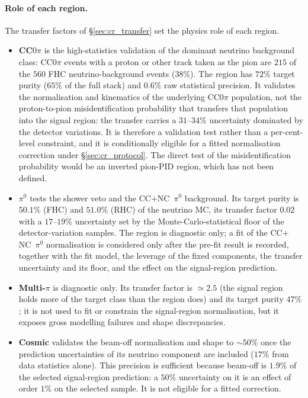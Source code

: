 \documentclass[11pt,a4paper]{article}
\begin{document}
\paragraph{Role of each region.} The transfer factors of \S\ref{sec:cr_transfer} set
the physics role of each region.
\begin{itemize}\itemsep2pt
  \item \textbf{CC$0\pi$} is the high-statistics validation of the dominant neutrino
    background class: CC$0\pi$ events with a proton or other track taken as the pion are
    $215$ of the $560$ FHC neutrino-background events ($38\%$). The region has $72\%$
    target purity ($65\%$ of the full stack) and $0.6\%$ raw statistical precision. It
    validates the normalisation and kinematics of the underlying CC$0\pi$ population,
    not the proton-to-pion misidentification probability that transfers that
    population into the signal region: the transfer carries a $31$--$34\%$ uncertainty
    dominated by the detector variations. It is therefore a validation test rather than
    a per-cent-level constraint, and it is conditionally eligible for a fitted
    normalisation correction under \S\ref{sec:cr_protocol}. The direct test of the
    misidentification probability would be an inverted pion-PID region, which has not been
    defined.
  \item \textbf{$\pi^0$} tests the shower veto and the CC$+$NC~$\pi^0$ background. Its
    target purity is $50.1\%$ (FHC) and $51.0\%$ (RHC) of the neutrino MC, its transfer
    factor $0.02$ with a $17$--$19\%$ uncertainty set by the Monte-Carlo-statistical
    floor of the detector-variation samples. The region is diagnostic only; a fit of the
    CC$+$NC~$\pi^0$ normalisation is considered only after the pre-fit result is recorded,
    together with the fit model, the leverage of the fixed components, the transfer
    uncertainty and its floor, and the effect on the signal-region prediction.
  \item \textbf{Multi-$\pi$} is diagnostic only. Its transfer factor is $\simeq2.5$
    (the signal region holds more of the target class than the region does) and its
    target purity $47\%$; it is not used to fit or constrain the signal-region
    normalisation, but it exposes gross modelling failures and shape discrepancies.
  \item \textbf{Cosmic} validates the beam-off normalisation and shape to $\sim\!50\%$
    once the prediction uncertainties of its neutrino component are included ($17\%$
    from data statistics alone). This precision is sufficient because beam-off is $1.9\%$ of the
    selected signal-region prediction: a $50\%$ uncertainty on it is an effect of order
    $1\%$ on the selected sample. It is not eligible for a fitted correction.
\end{itemize}
\end{document}
